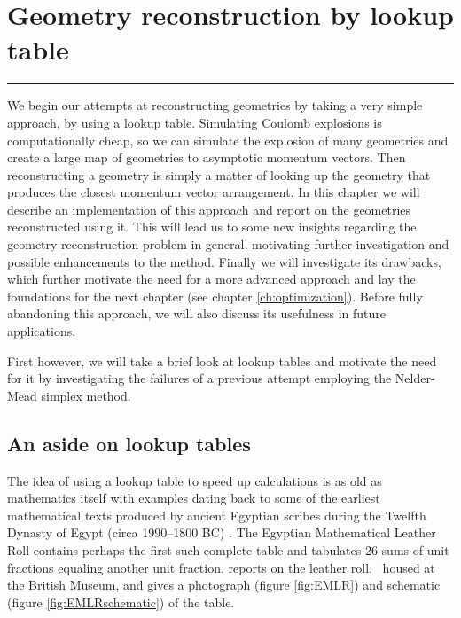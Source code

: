 \chapter{Geometry reconstruction by lookup table}\label{ch:lookupTable}

\vspace{-1.5 em}
\begin{addmargin}[-0.5cm]{0cm}
  \minitoc
\end{addmargin}
\hrule
\vspace{1.5 em}

\noindent
We begin our attempts at reconstructing geometries by taking a very simple approach, by using a lookup table. Simulating Coulomb explosions is computationally cheap, so we can simulate the explosion of many geometries and create a large map of geometries to asymptotic momentum vectors. Then reconstructing a geometry is simply a matter of looking up the geometry that produces the closest momentum vector arrangement. In this chapter we will describe an implementation of this approach and report on the geometries reconstructed using it. This will lead us to some new insights regarding the geometry reconstruction problem in general, motivating further investigation and possible enhancements to the method. Finally we will investigate its drawbacks, which further motivate the need for a more advanced approach and lay the foundations for the next chapter (see chapter \ref{ch:optimization}). Before fully abandoning this approach, we will also discuss its usefulness in future applications.

First however, we will take a brief look at lookup tables and motivate the need for it by investigating the failures of a previous attempt employing the Nelder-Mead simplex method.

\section{An aside on lookup tables}
The idea of using a lookup table to speed up calculations is as old as mathematics itself with examples dating back to some of the earliest mathematical texts produced by ancient Egyptian scribes during the Twelfth Dynasty of Egypt (circa 1990--1800 BC) \citep[p. 1, footnote 4]{Neugebauer45}. The Egyptian Mathematical Leather Roll contains perhaps the first such complete table and tabulates 26 sums of unit fractions equaling another unit fraction. \citet{Glanville27} reports on the leather roll,\footnotemark~ housed at the British Museum, and gives a photograph (figure \ref{fig:EMLR}) and schematic (figure \ref{fig:EMLRschematic}) of the table.

